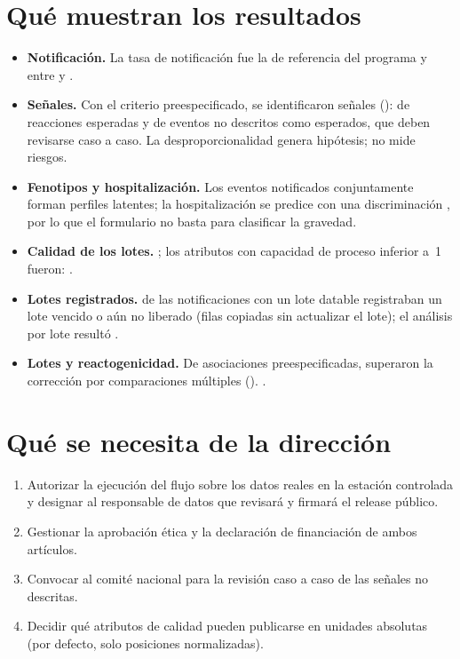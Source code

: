 \documentclass[11pt]{article}
\begin{document}
\section*{Qué muestran los resultados}
\begin{itemize}[leftmargin=*,itemsep=2pt]
\item \textbf{Notificación.} La tasa de notificación fue \PORateVsExpected{} la de referencia del
  programa y \POTrendWord{} entre \PORateFirstYear{} y \PORateLastYear.
\item \textbf{Señales.} Con el criterio preespecificado, se identificaron
  \POSignalsPrimaryFinlayVaccines{} señales (\POSignalList): \PONSignalsExpectedPhrase{} de
  reacciones esperadas y \PONSignalsEmergingPhrase{} de eventos no descritos como esperados, que
  deben revisarse caso a caso. La desproporcionalidad genera hipótesis; no mide riesgos.
\item \textbf{Fenotipos y hospitalización.} Los eventos notificados conjuntamente forman
  \POLCABestK{} perfiles latentes; la hospitalización se predice con una discriminación
  \PODiscriminationWord, por lo que el formulario no basta para clasificar la gravedad.
\item \textbf{Calidad de los lotes.} \PTConformitySentence; los atributos con capacidad de proceso
  inferior a~1 fueron: \PTPpkBelowOneList.
\item \textbf{Lotes registrados.} \PTLotInconsistentPct{} de las notificaciones con un lote
  datable registraban un lote vencido o aún no liberado (filas copiadas sin actualizar el lote); el
  análisis por lote resultó \PTFeasibilityWord.
\item \textbf{Lotes y reactogenicidad.} De \PTNPrimaryTests{} asociaciones preespecificadas,
  \PTNSignificantFDR{} superaron la corrección por comparaciones múltiples (\PTSignificantList).
  \PTNegControlSentence.
\end{itemize}

\section*{Qué se necesita de la dirección}
\begin{enumerate}[leftmargin=*,itemsep=2pt]
\item Autorizar la ejecución del flujo sobre los datos reales en la estación controlada y designar
  al responsable de datos que revisará y firmará el release público.
\item Gestionar la aprobación ética y la declaración de financiación de ambos artículos.
\item Convocar al comité nacional para la revisión caso a caso de las señales no descritas.
\item Decidir qué atributos de calidad pueden publicarse en unidades absolutas (por defecto, solo
  posiciones normalizadas).
\end{enumerate}
\end{document}
